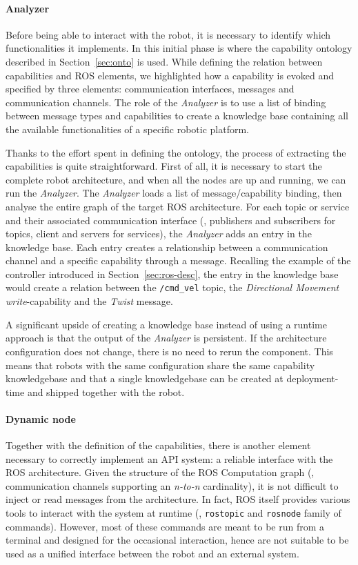 \paragraph{Analyzer} Before being able to interact with the robot, it is necessary to identify which functionalities it implements. In this initial phase is where the capability ontology described in Section~\ref{sec:onto} is used. While defining the relation between capabilities and ROS elements, we highlighted how a capability is evoked and specified by three elements: communication interfaces, messages and communication channels. The role of the \textit{Analyzer} is to use a list of binding between message types and capabilities to create a knowledge base containing all the available functionalities of a specific robotic platform.

Thanks to the effort spent in defining the ontology, the process of extracting the capabilities is quite straightforward. First of all, it is necessary to start the complete robot architecture, and when all the nodes are up and running, we can run the \textit{Analyzer}. The \textit{Analyzer} loads a list of message/capability binding, then analyse the entire graph of the target ROS architecture. For each topic or service and their associated communication interface (\ie, publishers and subscribers for topics, client and servers for services), the \textit{Analyzer} adds an entry in the knowledge base. Each entry creates a relationship between a communication channel and a specific capability through a message. Recalling the example of the controller introduced in Section~\ref{sec:ros-desc}, the entry in the knowledge base would create a relation between the \texttt{/cmd\_vel} topic, the \textit{Directional Movement} \textit{write}-capability and the \textit{Twist} message.

A significant upside of creating a knowledge base instead of using a runtime approach is that the output of the \textit{Analyzer} is persistent. If the architecture configuration does not change, there is no need to rerun the component. This means that robots with the same configuration share the same capability knowledgebase and that a single knowledgebase can be created at deployment-time and shipped together with the robot.

\paragraph{Dynamic node} Together with the definition of the capabilities, there is another element necessary to correctly implement an API system: a reliable interface with the ROS architecture. Given the structure of the ROS Computation graph (\ie, communication channels supporting an \textit{n-to-n} cardinality), it is not difficult to inject or read messages from the architecture. In fact, ROS itself provides various tools to interact with the system at runtime (\eg, \texttt{rostopic} and \texttt{rosnode} family of commands). However, most of these commands are meant to be run from a terminal and designed for the occasional interaction, hence are not suitable to be used as a unified interface between the robot and an external system.

